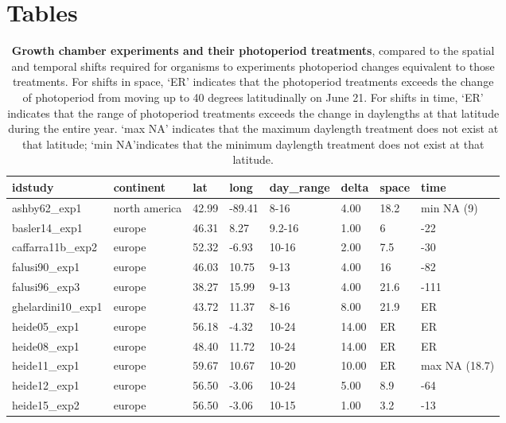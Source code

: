 \documentclass{article}
\begin{document}
\section* {Tables}
\begin{table}[ht]
\centering
\caption{\textbf{Growth chamber experiments and their photoperiod treatments}, compared to the spatial and temporal shifts required for organisms to experiments photoperiod changes equivalent to those treatments. For shifts in space, `ER' indicates that the photoperiod treatments exceeds the change of photoperiod from moving up to 40 degrees latitudinally on June 21. For shifts in time, `ER' indicates that the range of photoperiod treatments exceeds the change in daylengths at that latitude during the entire year. `max NA' indicates that the maximum daylength treatment does not exist at that latitude; `min NA'indicates that the minimum daylength treatment does not exist at that latitude.} 
\label{table:phototreats}
\begin{tabular}{|p{}|p{}|p{}|p{}|p{}|p{}|p{}|p{}|}
  \hline
idstudy & continent & lat & long & day\_range & delta & space & time \\ 
  \hline
ashby62\_exp1 & north america & 42.99 & -89.41 & 8-16 & 4.00 & 18.2 & min NA (9) \\ 
  basler14\_exp1 & europe & 46.31 & 8.27 & 9.2-16 & 1.00 & 6 & -22 \\ 
  caffarra11b\_exp2 & europe & 52.32 & -6.93 & 10-16 & 2.00 & 7.5 & -30 \\ 
  falusi90\_exp1 & europe & 46.03 & 10.75 & 9-13 & 4.00 & 16 & -82 \\ 
  falusi96\_exp3 & europe & 38.27 & 15.99 & 9-13 & 4.00 & 21.6 & -111 \\ 
  ghelardini10\_exp1 & europe & 43.72 & 11.37 & 8-16 & 8.00 & 21.9 & ER \\ 
  heide05\_exp1 & europe & 56.18 & -4.32 & 10-24 & 14.00 & ER & ER \\ 
  heide08\_exp1 & europe & 48.40 & 11.72 & 10-24 & 14.00 & ER & ER \\ 
  heide11\_exp1 & europe & 59.67 & 10.67 & 10-20 & 10.00 & ER & max NA (18.7) \\ 
  heide12\_exp1 & europe & 56.50 & -3.06 & 10-24 & 5.00 & 8.9 & -64 \\ 
  heide15\_exp2 & europe & 56.50 & -3.06 & 10-15 & 1.00 & 3.2 & -13 \\ 

\end{tabular}
\end{table}
\end{document}
